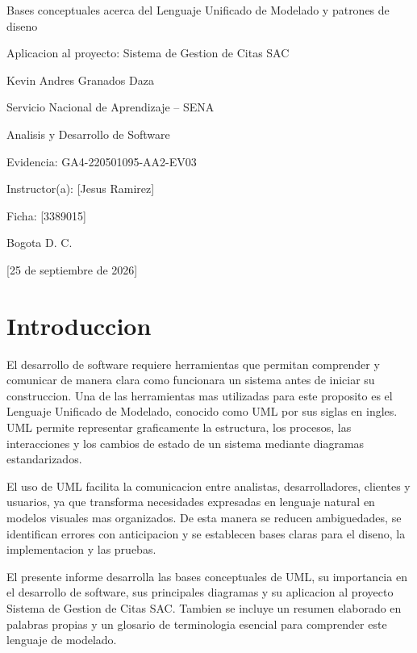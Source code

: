 \documentclass[12pt,letterpaper]{article}
\newcommand{\institucion}{Servicio Nacional de Aprendizaje -- SENA}
\newcommand{\programa}{Analisis y Desarrollo de Software}
\newcommand{\tituloTrabajo}{Bases conceptuales acerca del Lenguaje Unificado de Modelado y patrones de diseno}
\newcommand{\codigoEvidencia}{GA4-220501095-AA2-EV03}
\newcommand{\nombreProyecto}{Sistema de Gestion de Citas SAC}
\newcommand{\aprendiz}{Kevin Andres Granados Daza}
\newcommand{\instructor}{[Jesus Ramirez]}
\newcommand{\ficha}{[3389015]}
\newcommand{\ciudad}{Bogota D. C.}
\newcommand{\fechaEntrega}{[25 de septiembre de 2026]}
\begin{document}
\begin{titlepage}
    \centering
    \vspace*{2.5cm}
    {\Large \tituloTrabajo\par}
    \vspace{0.8cm}
    {\large Aplicacion al proyecto: \nombreProyecto\par}
    \vfill
    {\large \aprendiz\par}
    \vspace{1.5cm}
    {\large \institucion\par}
    {\large \programa\par}
    \vspace{1cm}
    {\large Evidencia: \codigoEvidencia\par}
    \vspace{1cm}
    {\large Instructor(a): \instructor\par}
    {\large Ficha: \ficha\par}
    \vfill
    {\large \ciudad\par}
    {\large \fechaEntrega\par}
\end{titlepage}

\section{Introduccion}

El desarrollo de software requiere herramientas que permitan comprender y comunicar de manera clara como funcionara un sistema antes de iniciar su construccion. Una de las herramientas mas utilizadas para este proposito es el Lenguaje Unificado de Modelado, conocido como UML por sus siglas en ingles. UML permite representar graficamente la estructura, los procesos, las interacciones y los cambios de estado de un sistema mediante diagramas estandarizados.

El uso de UML facilita la comunicacion entre analistas, desarrolladores, clientes y usuarios, ya que transforma necesidades expresadas en lenguaje natural en modelos visuales mas organizados. De esta manera se reducen ambiguedades, se identifican errores con anticipacion y se establecen bases claras para el diseno, la implementacion y las pruebas.

El presente informe desarrolla las bases conceptuales de UML, su importancia en el desarrollo de software, sus principales diagramas y su aplicacion al proyecto \nombreProyecto. Tambien se incluye un resumen elaborado en palabras propias y un glosario de terminologia esencial para comprender este lenguaje de modelado.
\end{document}
